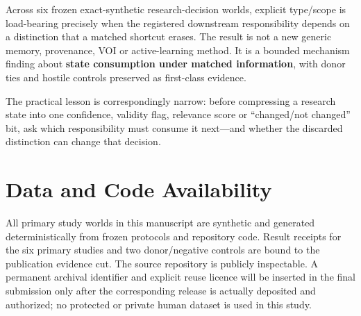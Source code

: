 \documentclass[10pt]{article}
\begin{document}
Across six frozen exact-synthetic research-decision worlds, explicit
type/scope is load-bearing precisely when the registered downstream
responsibility depends on a distinction that a matched shortcut erases.
The result is not a new generic memory, provenance, VOI or
active-learning method. It is a bounded mechanism finding about
\textbf{state consumption under matched information}, with donor ties
and hostile controls preserved as first-class evidence.

The practical lesson is correspondingly narrow: before compressing a
research state into one confidence, validity flag, relevance score or
``changed/not changed'' bit, ask which responsibility must consume it
next---and whether the discarded distinction can change that decision.

\section*{Data and Code Availability}
All primary study worlds in this manuscript are synthetic and generated deterministically
from frozen protocols and repository code. Result receipts for the six primary studies and
two donor/negative controls are bound to the publication evidence cut. The source repository
is publicly inspectable. A permanent archival identifier and explicit reuse licence will be
inserted in the final submission only after the corresponding release is actually deposited
and authorized; no protected or private human dataset is used in this study.



\end{document}
